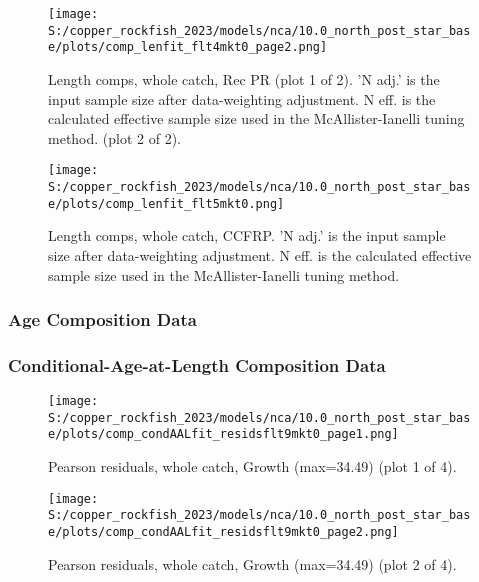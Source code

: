 \documentclass[11pt,
  letterpaper,
]{article}
\begin{document}
\begin{figure}
{\centering
\texttt{[image: S:/copper\_rockfish\_2023/models/nca/10.0\_north\_post\_star\_base/plots/comp\_lenfit\_flt4mkt0\_page2.png]}
}
\caption{Length comps, whole catch, Rec PR (plot 1 of 2).  'N adj.' is the input sample size after data-weighting adjustment. N eff. is the calculated effective sample size used in the McAllister-Ianelli tuning method. (plot 2 of 2).\label{fig:comp-lenfit-flt4mkt0-page2}}
\end{figure}

\begin{figure}
{\centering
\texttt{[image: S:/copper\_rockfish\_2023/models/nca/10.0\_north\_post\_star\_base/plots/comp\_lenfit\_flt5mkt0.png]}
}
\caption{Length comps, whole catch, CCFRP.  'N adj.' is the input sample size after data-weighting adjustment. N eff. is the calculated effective sample size used in the McAllister-Ianelli tuning method.\label{fig:comp-lenfit-flt5mkt0}}
\end{figure}

\newpage

\subsubsection{Age Composition Data}\label{age-data}

\newpage

\subsubsection{Conditional-Age-at-Length Composition Data}\label{caal-data}

\begin{figure}
{\centering
\texttt{[image: S:/copper\_rockfish\_2023/models/nca/10.0\_north\_post\_star\_base/plots/comp\_condAALfit\_residsflt9mkt0\_page1.png]}
}
\caption{Pearson residuals, whole catch, Growth (max=34.49) (plot 1 of 4).\label{fig:comp-condAALfit-residsflt9mkt0-page1}}
\end{figure}

\begin{figure}
{\centering
\texttt{[image: S:/copper\_rockfish\_2023/models/nca/10.0\_north\_post\_star\_base/plots/comp\_condAALfit\_residsflt9mkt0\_page2.png]}
}
\caption{Pearson residuals, whole catch, Growth (max=34.49) (plot 2 of 4).\label{fig:comp-condAALfit-residsflt9mkt0-page2}}
\end{figure}
\end{document}

